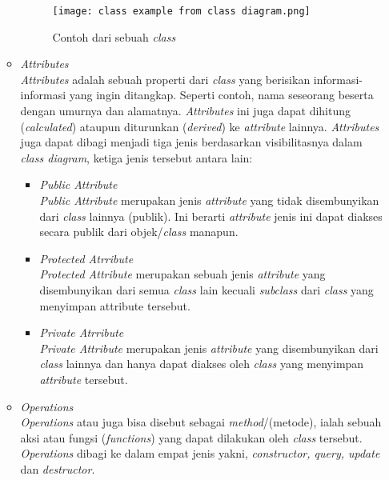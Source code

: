 \documentclass[a4paper]{article}
\begin{document}
\begin{enumerate}
\begin{itemize}
\begin{figure}[h]
            \centering
            \texttt{[image: class example from class diagram.png]}
            \caption{Contoh dari sebuah \textit{class}}
        \end{figure}
        \newpage
        \item \textit{Attributes}\\
        \textit{Attributes} adalah sebuah properti dari \textit{class} yang berisikan informasi-informasi yang ingin ditangkap. Seperti contoh, nama seseorang beserta dengan umurnya dan alamatnya. \textit{Attributes} ini juga dapat dihitung (\textit{calculated}) ataupun diturunkan (\textit{derived}) ke \textit{attribute} lainnya\autocite{systemanalysisdesign-class-diagram}.
        \textit{Attributes} juga dapat dibagi menjadi tiga jenis berdasarkan visibilitasnya dalam \textit{class diagram}, ketiga jenis tersebut antara lain:
        \begin{itemize}
            \item \textit{Public Attribute}\\
            \textit{Public Attribute} merupakan jenis \textit{attribute} yang tidak disembunyikan dari \textit{class} lainnya (publik). Ini berarti \textit{attribute} jenis ini dapat diakses secara publik dari objek/\textit{class} manapun\autocite{systemanalysisdesign-class-diagram}.
            \item \textit{Protected Atrribute}\\
            \textit{Protected Attribute} merupakan sebuah jenis \textit{attribute} yang disembunyikan dari semua \textit{class} lain kecuali \textit{subclass} dari \textit{class} yang menyimpan attribute tersebut\autocite{systemanalysisdesign-class-diagram}.
            \item \textit{Private Atrribute}\\
            \textit{Private Attribute} merupakan jenis \textit{attribute} yang disembunyikan dari \textit{class} lainnya dan hanya dapat diakses oleh \textit{class} yang menyimpan \textit{attribute} tersebut\autocite{systemanalysisdesign-class-diagram}.
        \end{itemize}
        \item \textit{Operations}\\
        \textit{Operations} atau juga bisa disebut sebagai \textit{method}/(metode), ialah sebuah aksi atau fungsi (\textit{functions}) yang dapat dilakukan oleh \textit{class} tersebut. \textit{Operations} dibagi ke dalam empat jenis yakni, \textit{constructor, query, update} dan \textit{destructor}\autocite{systemanalysisdesign-class-diagram}.

\end{itemize}
\end{enumerate}
\end{document}
